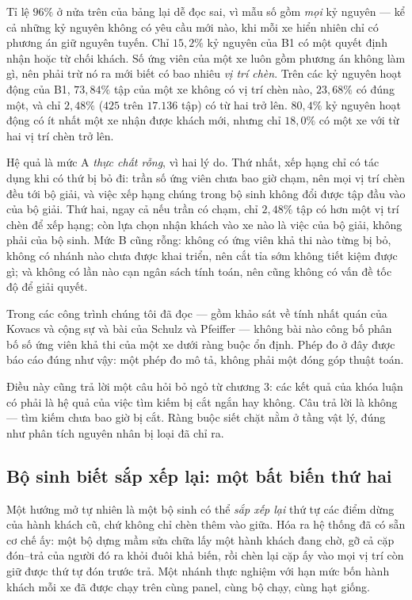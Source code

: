 Tỉ lệ $96\%$ ở nửa trên của bảng lại dễ đọc sai, vì mẫu số gồm \emph{mọi} kỷ nguyên --- kể cả
những kỷ nguyên không có yêu cầu mới nào, khi mỗi xe hiển nhiên chỉ có phương án giữ nguyên tuyến.
Chỉ $15{,}2\%$ kỷ nguyên của B1 có một quyết định nhận hoặc từ chối khách. Số ứng viên của một xe
luôn gồm phương án không làm gì, nên phải trừ nó ra mới biết có bao nhiêu \emph{vị trí chèn}. Trên
các kỷ nguyên hoạt động của B1, $73{,}84\%$ tập của một xe không có vị trí chèn nào, $23{,}68\%$ có
đúng một, và chỉ $2{,}48\%$ ($425$ trên $17.136$ tập) có từ hai trở lên. $80{,}4\%$ kỷ nguyên hoạt
động có ít nhất một xe nhận được khách mới, nhưng chỉ $18{,}0\%$ có một xe với từ hai vị trí chèn
trở lên.

Hệ quả là mức A \emph{thực chất rỗng}, vì hai lý do. Thứ nhất, xếp hạng chỉ có tác dụng khi có thứ
bị bỏ đi: trần số ứng viên chưa bao giờ chạm, nên mọi vị trí chèn đều tới bộ giải, và việc xếp hạng
chúng trong bộ sinh không đổi được tập đầu vào của bộ giải. Thứ hai, ngay cả nếu trần có chạm, chỉ
$2{,}48\%$ tập có hơn một vị trí chèn để xếp hạng; còn lựa chọn nhận khách vào xe nào là việc của
bộ giải, không phải của bộ sinh. Mức B cũng rỗng: không có ứng viên khả thi nào từng bị bỏ, không có
nhánh nào chưa được khai triển, nên cắt tỉa sớm không tiết kiệm được gì; và không có lần nào cạn
ngân sách tính toán, nên cũng không có vấn đề tốc độ để giải quyết.

Trong các công trình chúng tôi đã đọc --- gồm khảo sát về tính nhất quán của Kovacs và cộng sự
\cite{kovacs2014} và bài của Schulz và Pfeiffer \cite{schulz2026} --- không bài nào công bố phân bố
số ứng viên khả thi của một xe dưới ràng buộc ổn định. Phép đo ở đây được báo cáo đúng như vậy:
một phép đo mô tả, không phải một đóng góp thuật toán.

Điều này cũng trả lời một câu hỏi bỏ ngỏ từ chương 3: các kết quả của khóa luận có phải là hệ
quả của việc tìm kiếm bị cắt ngắn hay không. Câu trả lời là không --- tìm kiếm chưa bao giờ bị
cắt. Ràng buộc siết chặt nằm ở tầng vật lý, đúng như phân tích nguyên nhân bị loại đã chỉ ra.

\subsection{Bộ sinh biết sắp xếp lại: một bất biến thứ hai}

Một hướng mở tự nhiên là một bộ sinh có thể \emph{sắp xếp lại} thứ tự các điểm dừng của
hành khách cũ, chứ không chỉ chèn thêm vào giữa. Hóa ra hệ thống đã có sẵn cơ chế ấy: một bộ
dựng mầm sửa chữa lấy một hành khách đang chờ, gỡ cả cặp đón--trả của người đó ra khỏi đuôi khả
biến, rồi chèn lại cặp ấy vào mọi vị trí còn giữ được thứ tự đón trước trả. Một nhánh thực
nghiệm với hạn mức bốn hành khách mỗi xe đã được chạy trên cùng panel, cùng bộ chạy, cùng hạt
giống.

